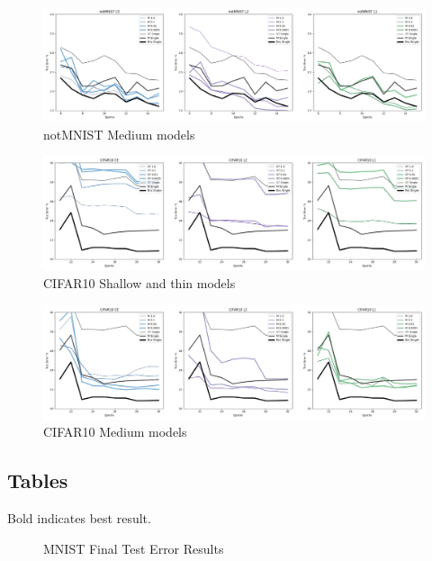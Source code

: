 \documentclass[english,a4paper,oneside]{amsart}
\theoremstyle{definition}
\begin{document}
\begin{figure}[H]
	\begin{center} \includegraphics[scale=0.3]{graphs/notMNIST_M_TestError.png}\end{center}
	\caption{notMNIST Medium models}\label{MnotMNISTFig}
\end{figure}
\begin{figure}[H]
	\begin{center} \includegraphics[scale=0.3]{graphs/CIFAR10_ST_TestError.png}\end{center}
	\caption{CIFAR10 Shallow and thin models}\label{STCIFAR10Fig}
\end{figure}
\begin{figure}[H]
	\begin{center} \includegraphics[scale=0.3]{graphs/CIFAR10_M_TestError.png}\end{center}
	\caption{CIFAR10 Medium models}\label{MCIFAR10Fig}
\end{figure}


\subsection{Tables}
Bold indicates best result. 
\begin{figure}[H]
\begin{center}

\end{center}
\caption{MNIST Final Test Error Results}\label{MNISTTab}
\end{figure}
\end{document}
